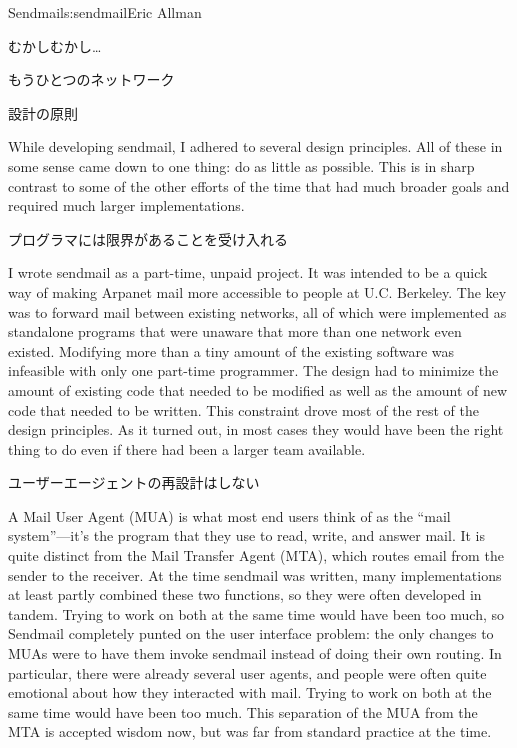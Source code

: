 \begin{aosachapter}{Sendmail}{s:sendmail}{Eric Allman}
\begin{aosasect1}{むかしむかし\ldots}
\begin{aosabox}{もうひとつのネットワーク}
\end{aosabox}

\end{aosasect1}

\begin{aosasect1}{設計の原則}

While developing sendmail, I adhered to several design principles. All
of these in some sense came down to one thing: do as little as
possible.  This is in sharp contrast to some of the other efforts of
the time that had much broader goals and required much larger
implementations.

\begin{aosasect2}{プログラマには限界があることを受け入れる}

I wrote sendmail as a part-time, unpaid project. It was intended to be
a quick way of making Arpanet mail more accessible to people at
U.C. Berkeley. The key was to forward mail between existing networks,
all of which were implemented as standalone programs that were unaware
that more than one network even existed. Modifying more than a tiny
amount of the existing software was infeasible with only one part-time
programmer.  The design had to minimize the amount of existing code
that needed to be modified as well as the amount of new code that
needed to be written.  This constraint drove most of the rest of the
design principles. As it turned out, in most cases they would have
been the right thing to do even if there had been a larger team
available.

\end{aosasect2}

\begin{aosasect2}{ユーザーエージェントの再設計はしない}

A Mail User Agent (MUA) is what most end users think of as the ``mail
system''---it's the program that they use to read, write, and answer
mail. It is quite distinct from the Mail Transfer Agent (MTA), which
routes email from the sender to the receiver. At the time sendmail was
written, many implementations at least partly combined these two
functions, so they were often developed in tandem. Trying to work on
both at the same time would have been too much, so Sendmail completely
punted on the user interface problem: the only changes to MUAs were to
have them invoke sendmail instead of doing their own routing. In
particular, there were already several user agents, and people were
often quite emotional about how they interacted with mail.
Trying to work on both at the same time would have been too much.
This
separation of the MUA from the MTA is accepted wisdom now, but was far
from standard practice at the time.


\end{aosasect2}
\end{aosasect1}
\end{aosachapter}

